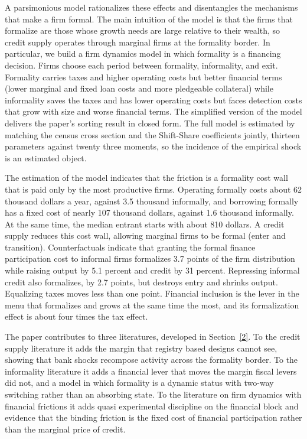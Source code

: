 \documentclass[12pt]{article}
\begin{document}
A parsimonious model rationalizes these effects and disentangles the mechanisms that make a firm formal. The main intuition of the model is that the firms that formalize are those whose growth needs are large relative to their wealth, so credit supply operates through marginal firms at the formality border. In particular, we build a firm dynamics model in which formality is a financing decision. Firms choose each period between formality, informality, and exit. Formality carries taxes and higher operating costs but better financial terms (lower marginal and fixed loan costs and more pledgeable collateral) while informality saves the taxes and has lower operating costs but faces detection costs that grow with size and worse financial terms. The simplified version of the model delivers the paper's sorting result in closed form. The full model is estimated by matching the census cross section and the Shift-Share coefficients jointly, thirteen parameters against twenty three moments, so the incidence of the empirical shock is an estimated object.

The estimation of the model indicates that the friction is a formality cost wall that is paid only by the most productive firms. Operating formally costs about 62 thousand dollars a year, against 3.5 thousand informally, and borrowing formally has a fixed cost of nearly 107 thousand dollars, against 1.6 thousand informally. At the same time, the median entrant starts with about 810 dollars. A credit supply reduces this cost wall, allowing marginal firms to be formal (enter and transition). Counterfactuals indicate that granting the formal finance participation cost to informal firms formalizes 3.7 points of the firm distribution while raising output by 5.1 percent and credit by 31 percent. Repressing informal credit also formalizes, by 2.7 points, but destroys entry and shrinks output. Equalizing taxes moves less than one point. Financial inclusion is the lever in the menu that formalizes and grows at the same time the most, and its formalization effect is about four times the tax effect.

The paper contributes to three literatures, developed in Section~\ref{2}. To the credit supply literature it adds the margin that registry based designs cannot see, showing that bank shocks recompose activity across the formality border. To the informality literature it adds a financial lever that moves the margin fiscal levers did not, and a model in which formality is a dynamic status with two-way switching rather than an absorbing state. To the literature on firm dynamics with financial frictions it adds quasi experimental discipline on the financial block and evidence that the binding friction is the fixed cost of financial participation rather than the marginal price of credit.
\end{document}
